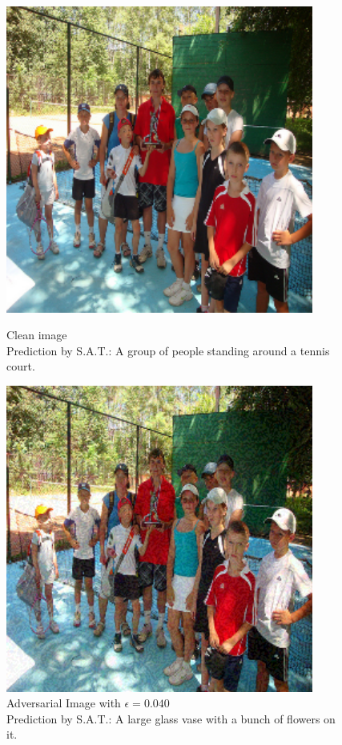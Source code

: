 \begin{figure}[ht]
    \centering
    \begin{minipage}{0.45\textwidth}
        \centering
        \includegraphics[width=0.9\textwidth]{figures/fast_method_group_of_people/group_of_people_0.000.png} %
        \caption*{Clean image\\Prediction by S.A.T.: A group of people standing around a tennis court.}
    \end{minipage}\hfill
    \begin{minipage}{0.45\textwidth}
        \centering
        \includegraphics[width=0.9\textwidth]{figures/fast_method_group_of_people/group_of_people_0.040.png} %
        \caption*{Adversarial Image with $\epsilon=0.040$\\Prediction by S.A.T.:  A large glass vase with a bunch of flowers on it.}
    \end{minipage}
\end{figure}


